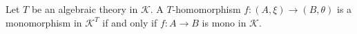 Let $T$ be an algebraic theory in $\mathcal{K}$. A $T$-homomorphism $f: (A, \xi) \longrightarrow (B, \theta)$ is a monomorphism in $\mathcal{K}^T$ if and only if $f: A \longrightarrow B$ is mono in $\mathcal{K}$.
